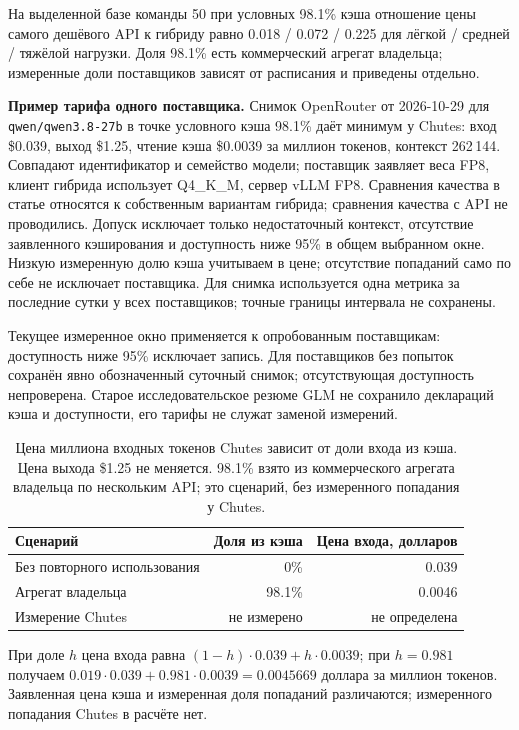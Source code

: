 На выделенной базе команды 50 при условных 98.1\% кэша отношение цены самого дешёвого API к гибриду
равно 0.018 / 0.072 / 0.225 для лёгкой / средней / тяжёлой нагрузки.
Доля 98.1\% есть коммерческий агрегат владельца; измеренные доли поставщиков зависят от расписания и приведены отдельно.

\textbf{Пример тарифа одного поставщика.} Снимок OpenRouter от 2026-10-29 для \texttt{qwen/qwen3.8-27b}
в точке условного кэша 98.1\% даёт минимум у Chutes: вход \$0.039, выход \$1.25, чтение кэша \$0.0039 за миллион токенов,
контекст 262\,144. Совпадают идентификатор и семейство модели; поставщик заявляет веса FP8,
клиент гибрида использует Q4\_K\_M, сервер vLLM FP8. Сравнения качества в статье относятся к собственным
вариантам гибрида; сравнения качества с API не проводились.
Допуск исключает только недостаточный контекст, отсутствие заявленного кэширования и доступность ниже 95\%
в общем выбранном окне. Низкую измеренную долю кэша учитываем в цене; отсутствие попаданий само по себе не исключает поставщика.
Для снимка используется одна метрика за последние сутки у всех поставщиков; точные границы интервала не сохранены.

Текущее измеренное окно применяется к опробованным поставщикам: доступность ниже 95\% исключает запись.
Для поставщиков без попыток сохранён явно обозначенный суточный снимок; отсутствующая доступность непроверена.
Старое исследовательское резюме GLM не сохранило деклараций кэша и доступности, его тарифы не служат заменой измерений.

\begin{table}[t]
\centering
\caption{Цена миллиона входных токенов Chutes зависит от доли входа из кэша. Цена выхода \$1.25 не меняется.
98.1\% взято из коммерческого агрегата владельца по нескольким API; это сценарий, без измеренного попадания у Chutes.}
\label{tab:cache-price}
\footnotesize
\begin{tabular}{lrr}
\toprule
Сценарий & Доля из кэша & Цена входа, долларов \\
\midrule
Без повторного использования & 0\% & 0.039 \\
Агрегат владельца & 98.1\% & 0.0046 \\
Измерение Chutes & не измерено & не определена \\
\bottomrule
\end{tabular}
\end{table}

При доле $h$ цена входа равна $(1-h)\cdot0.039+h\cdot0.0039$;
при $h=0.981$ получаем $0.019\cdot0.039+0.981\cdot0.0039=0.0045669$ доллара за миллион токенов.
Заявленная цена кэша и измеренная доля попаданий различаются; измеренного попадания Chutes в расчёте нет.

